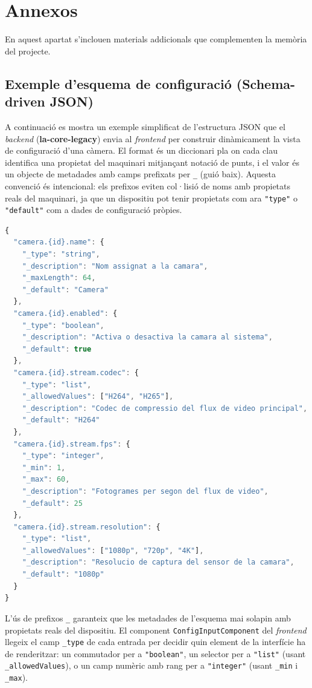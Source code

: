 \chapter{Annexos}
\label{ch:annexos}

En aquest apartat s'inclouen materials addicionals que complementen la memòria del projecte.

\section{Exemple d'esquema de configuració (Schema-driven JSON)}
\label{annex:schema_json}
A continuació es mostra un exemple simplificat de l'estructura JSON que el \textit{backend} (\textbf{la-core-legacy}) envia al \textit{frontend} per construir dinàmicament la vista de configuració d'una càmera. El format és un diccionari pla on cada clau identifica una propietat del maquinari mitjançant notació de punts, i el valor és un objecte de metadades amb camps prefixats per \texttt{\_} (guió baix). Aquesta convenció és intencional: els prefixos eviten col·lisió de noms amb propietats reals del maquinari, ja que un dispositiu pot tenir propietats com ara \texttt{"type"} o \texttt{"default"} com a dades de configuració pròpies.

\begin{lstlisting}[language=JavaScript, caption={Exemple d'esquema JSON de metadades per a la configuració d'una càmera IP.}, label={lst:schema_json}]
{
  "camera.{id}.name": {
    "_type": "string",
    "_description": "Nom assignat a la camara",
    "_maxLength": 64,
    "_default": "Camera"
  },
  "camera.{id}.enabled": {
    "_type": "boolean",
    "_description": "Activa o desactiva la camara al sistema",
    "_default": true
  },
  "camera.{id}.stream.codec": {
    "_type": "list",
    "_allowedValues": ["H264", "H265"],
    "_description": "Codec de compressio del flux de video principal",
    "_default": "H264"
  },
  "camera.{id}.stream.fps": {
    "_type": "integer",
    "_min": 1,
    "_max": 60,
    "_description": "Fotogrames per segon del flux de video",
    "_default": 25
  },
  "camera.{id}.stream.resolution": {
    "_type": "list",
    "_allowedValues": ["1080p", "720p", "4K"],
    "_description": "Resolucio de captura del sensor de la camara",
    "_default": "1080p"
  }
}
\end{lstlisting}

L'ús de prefixos \texttt{\_} garanteix que les metadades de l'esquema mai solapin amb propietats reals del dispositiu. El component \texttt{ConfigInputComponent} del \textit{frontend} llegeix el camp \texttt{\_type} de cada entrada per decidir quin element de la interfície ha de renderitzar: un commutador per a \texttt{"boolean"}, un selector per a \texttt{"list"} (usant \texttt{\_allowedValues}), o un camp numèric amb rang per a \texttt{"integer"} (usant \texttt{\_min} i \texttt{\_max}).
